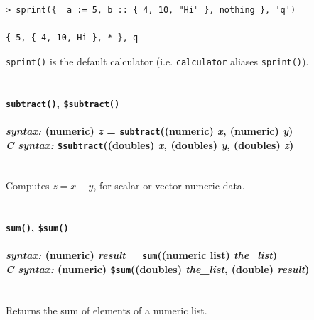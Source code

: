 \documentclass{article}
\newenvironment{code}{
       \begin{list}{}{
               \setlength{\leftmargin}{.4in}
               \setlength{\rightmargin}{0in}
               \setlength{\topsep}{.2in}
       }
       \small
       \item[] }
       { \end{list}   }
\begin{document}
\begin{code} \begin{verbatim}
> sprint({  a := 5, b :: { 4, 10, "Hi" }, nothing }, 'q')

{ 5, { 4, 10, Hi }, * }, q
\end{verbatim} \end{code}

\verb#sprint()# is the default calculator (i.e. \verb#calculator# aliases \verb#sprint()#).\\\\




\paragraph{\texttt{subtract()}, \texttt{\$subtract()}\\\\
\normalfont \emph{syntax: } (numeric) \emph{z} = \texttt{subtract}((numeric) \emph{x}, (numeric) \emph{y})\\
\normalfont \emph{C syntax: } \texttt{\$subtract}((doubles) \emph{x}, (doubles) \emph{y}, (doubles) \emph{z})\\\\}

Computes $z = x - y$, for scalar or vector numeric data.\\\\




\paragraph{\texttt{sum()}, \texttt{\$sum()}\\\\
\normalfont \emph{syntax: } (numeric) \emph{result} = \texttt{sum}((numeric list) \emph{the\_list})\\
\normalfont \emph{C syntax: } (numeric) \texttt{\$sum}((doubles) \emph{the\_list}, (double) \emph{result})\\\\}

Returns the sum of elements of a numeric list.\\\\
\end{document}
